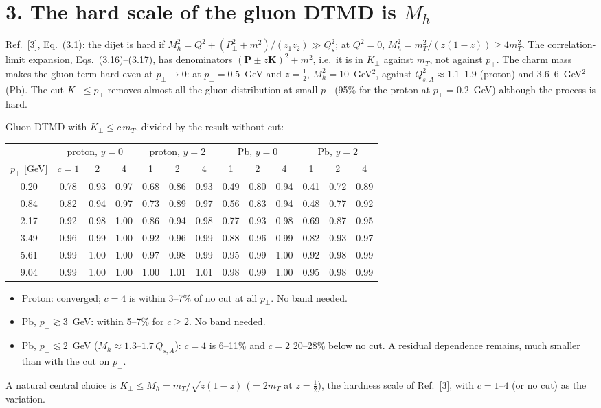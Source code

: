 \documentclass[12pt]{article}
\begin{document}
\section*{3. The hard scale of the gluon DTMD is $M_h$}

Ref.~[3], Eq.~(3.1): the dijet is hard if $M_h^2=Q^2+(P_\perp^2+m^2)/(z_1z_2)\gg Q_s^2$; at $Q^2=0$,
$M_h^2=m_T^2/(z(1-z))\geq4m_T^2$. The correlation-limit expansion, Eqs.~(3.16)--(3.17), has
denominators $(\mathbf{P}\pm z\mathbf{K})^2+m^2$, i.e.\ it is in $K_\perp$ against $m_T$, not against
$p_\perp$. The charm mass makes the gluon term hard even at $p_\perp\to0$: at $p_\perp=0.5$~GeV and
$z=\tfrac12$, $M_h^2=10$~GeV$^2$, against $Q_{s,A}^2\approx1.1$--$1.9$ (proton) and $3.6$--$6$~GeV$^2$
(Pb). The cut $K_\perp\leq p_\perp$ removes almost all the gluon distribution at small $p_\perp$ (95\% for
the proton at $p_\perp=0.2$~GeV) although the process is hard.

Gluon DTMD with $K_\perp\leq c\,m_T$, divided by the result without cut:
\begin{center}
\begin{tabular}{c|ccc|ccc|ccc|ccc}
\toprule
 & \multicolumn{3}{c|}{proton, $y=0$} & \multicolumn{3}{c|}{proton, $y=2$}
 & \multicolumn{3}{c|}{Pb, $y=0$} & \multicolumn{3}{c}{Pb, $y=2$} \\
$p_\perp$ [GeV] & $c=1$ & 2 & 4 & 1 & 2 & 4 & 1 & 2 & 4 & 1 & 2 & 4 \\
\midrule
0.20 & 0.78 & 0.93 & 0.97 & 0.68 & 0.86 & 0.93 & 0.49 & 0.80 & 0.94 & 0.41 & 0.72 & 0.89 \\
0.84 & 0.82 & 0.94 & 0.97 & 0.73 & 0.89 & 0.97 & 0.56 & 0.83 & 0.94 & 0.48 & 0.77 & 0.92 \\
2.17 & 0.92 & 0.98 & 1.00 & 0.86 & 0.94 & 0.98 & 0.77 & 0.93 & 0.98 & 0.69 & 0.87 & 0.95 \\
3.49 & 0.96 & 0.99 & 1.00 & 0.92 & 0.96 & 0.99 & 0.88 & 0.96 & 0.99 & 0.82 & 0.93 & 0.97 \\
5.61 & 0.99 & 1.00 & 1.00 & 0.97 & 0.98 & 0.99 & 0.95 & 0.99 & 1.00 & 0.92 & 0.98 & 0.99 \\
9.04 & 0.99 & 1.00 & 1.00 & 1.00 & 1.01 & 1.01 & 0.98 & 0.99 & 1.00 & 0.95 & 0.98 & 0.99 \\
\bottomrule
\end{tabular}
\end{center}
\begin{itemize}
\item Proton: converged; $c=4$ is within 3--7\% of no cut at all $p_\perp$. No band needed.
\item Pb, $p_\perp\gtrsim3$~GeV: within 5--7\% for $c\geq2$. No band needed.
\item Pb, $p_\perp\lesssim2$~GeV ($M_h\approx1.3$--$1.7\,Q_{s,A}$): $c=4$ is 6--11\% and $c=2$ 20--28\%
  below no cut. A residual dependence remains, much smaller than with the cut on $p_\perp$.
\end{itemize}
A natural central choice is $K_\perp\leq M_h=m_T/\sqrt{z(1-z)}$ ($=2m_T$ at $z=\tfrac12$), the hardness
scale of Ref.~[3], with $c=1$--$4$ (or no cut) as the variation.
\end{document}
